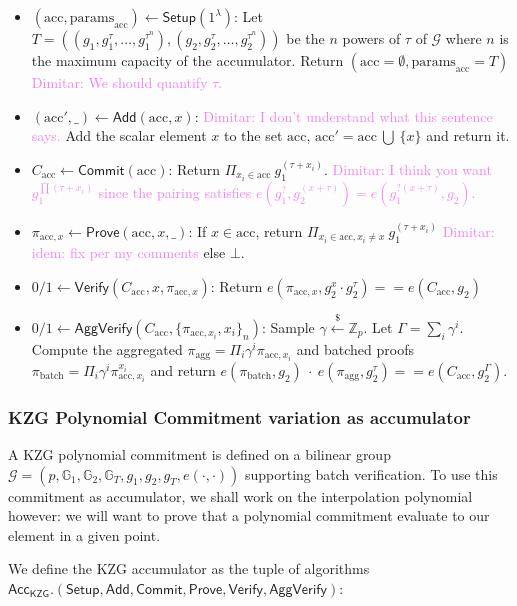 \documentclass{article}
\newcommand{\isequal}{\ensuremath{==}\xspace}
\newcommand{\Zp}{\ensuremath{\mathbb{Z}_p}\xspace}
\newcommand{\G}[1]{\ensuremath{\mathbb{G}_{#1}}\xspace}
\newcommand{\e}[2]{\ensuremath{e(#1,\xspace #2)}\xspace}
\newcommand{\acc}{\ensuremath{\textrm{acc}}\xspace}
\newcommand{\pp}{\ensuremath{\textrm{params}}\xspace}
\newcommand{\Acc}{\ensuremath{\mathsf{Acc}}\xspace}
\newcommand{\Verify}{\ensuremath{\mathsf{Verify}}\xspace}
\newcommand{\AggVerify}{\ensuremath{\mathsf{AggVerify}}\xspace}
\newcommand{\Setup}{\ensuremath{\mathsf{Setup}}\xspace}
\newcommand{\Add}{\ensuremath{\mathsf{Add}}\xspace}
\newcommand{\Prove}{\ensuremath{\mathsf{Prove}}\xspace}
\newcommand{\Commit}{\ensuremath{\mathsf{Commit}}\xspace}
\newcommand{\sample}{\ensuremath{\xleftarrow{\$}}\xspace}
\newcommand{\dimitar}[1]{\textcolor{violet}{Dimitar: #1}\xspace}
\begin{document}
\begin{itemize}
    \item $(\acc, \pp_\acc) \leftarrow \Setup(1^\lambda)$: Let $T = ((g_1, g_1^\tau, \dots, g_1^{\tau^n}), (g_2, g_2^\tau, \dots, g_2^{\tau^n}))$ be the $n$ powers of $\tau$ of $\mathcal{G}$ where $n$ is the maximum capacity of the accumulator. Return $(\acc =\emptyset, \pp_\acc=T)$ \dimitar{We should quantify $\tau$.}
    \item $(\acc', \_) \leftarrow \Add(\acc, x)$:  \dimitar{I don't understand what this sentence says.} Add the scalar element $x$ to the set \acc, $\acc' = \acc\ \bigcup\ \{x\}$ and return it.
    \item $C_\acc \leftarrow \Commit(\acc)$: Return $\Pi_{x_i \in \acc}\ g_1^{(\tau + x_i)}$. \dimitar{I think you want $g_1^{\prod (\tau + x_i)}$ since the pairing satisfies $e(g_1^{?}, g_2^{(x + \tau)}) = e(g_1^{? (x + \tau)}, g_2)$.}
    \item $\pi_{\acc, x} \leftarrow \Prove(\acc, x, \_)$: If $x \in \acc$, return $\Pi_{x_i \in \acc, x_i \neq x}\ g_1^{(\tau + x_i)}$  \dimitar{idem: fix per my comments} else $\bot$.
    \item $0/1 \leftarrow \Verify(C_\acc, x, \pi_{\acc, x})$: Return $\e{\pi_{\acc, x}}{g_2^x \cdot g_2^\tau} \isequal \e{C_\acc}{g_2}$
    \item $0/1 \leftarrow \AggVerify(C_\acc, \{\pi_{\acc, x_i}, x_i\}_n)$:
    Sample $\gamma \sample \Zp$. Let $\Gamma = \sum_i \gamma^i$. Compute the aggregated $\pi_\text{agg} = \Pi_i \gamma^i \pi_{\acc, x_i}$ and batched proofs $\pi_\text{batch} = \Pi_i \gamma^i \pi_{\acc, x_i}^{x_i}$  and return $\e{\pi_\text{batch}}{g_2}\ \cdot\ \e{\pi_\text{agg}}{g_2^\tau} \isequal \e{C_\acc}{g_2^\Gamma}$.
\end{itemize}

%
\subsubsection{KZG Polynomial Commitment variation as accumulator}
A KZG polynomial commitment is defined on a bilinear group $\mathcal{G} = (p,\G{1}, \G{2}, \G{T}, g_1, g_2, g_T, \e{\cdot}{\cdot})$ supporting batch verification. To use this commitment as accumulator, we shall work on the interpolation polynomial however: we will want to prove that a polynomial commitment evaluate to our element in a given point.

We define the KZG accumulator as the tuple of algorithms\\ $\Acc_{\textsf{KZG}}.(\Setup, \Add, \Commit, \Prove, \Verify, \AggVerify)$:
\end{document}
